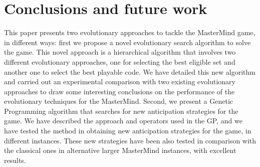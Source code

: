 

\section{Conclusions and future work}\label{Conclusions}

This paper presents two evolutionary approaches to tackle the MasterMind game, in different ways: first
we propose a novel evolutionary search algorithm to solve the game. This novel approach is
a hierarchical algorithm that involves two different evolutionary approaches,
one for selecting the best eligible set and another one to select the best playable
code. We have detailed this new algorithm and carried out an experimental
comparison with two existing evolutionary approaches to draw some interesting
conclusions on the performance of the evolutionary techniques for the
MasterMind. Second, we present a Genetic Programming algorithm that searches for
new anticipation strategies for the game. We have described the approach and
operators used in the GP, and we have tested the method in obtaining new anticipation
strategies for the game, in different instances. These new strategies have been also
tested in comparison with the classical ones in alternative larger MasterMind instances,
with excellent results. 

